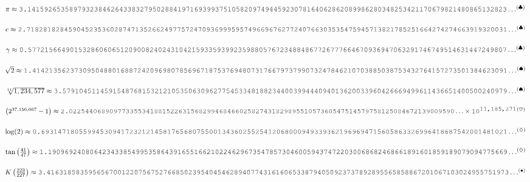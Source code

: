 \begin{flushleft}

\large

\vspace{0.0pt} $\pi \approx
\mbox{\courier{3.1415926535897932384626433832795028841971693993751058209749445923078164062862089986280348253421170679821480865132823}}\dots^{\left ( \clubsuit \right )}$

\vspace{7.0pt} $e \approx
\mbox{\courier{2.7182818284590452353602874713526624977572470936999595749669676277240766303535475945713821785251664274274663919320031}}\dots^{\left ( \clubsuit \right )}$

\vspace{7.0pt} $\gamma \approx
\mbox{\courier{0.577215664901532860606512090082402431042159335939923598805767234884867726777664670936947063291746749514631447249807}}\dots^{\left ( \clubsuit \right )}$

\vspace{7.0pt} $\sqrt{2} \approx
\mbox{\courier{1.41421356237309504880168872420969807856967187537694807317667973799073247846210703885038753432764157273501384623091}}\dots^{\left ( \spadesuit \right )}$

\vspace{7.0pt} $\sqrt[11]{1,234,577} \approx
\mbox{\courier{3.5791045114591548768153212105350630962775453348188234400399444094013620033960426669499611436651400500240979}}\dots^{\left ( \spadesuit \right )}$

\vspace{7.0pt} $\left ( 2^{37,156,667} - 1 \right ) \approx
\mbox{\courier{2.02254406890977335534188152263156829946846602582743182989551057360547514579758125084672139009590}}\dots\courierNineMakeTenPowX{11,185,271}{^{\left ( \heartsuit \right )}}$

\vspace{7.0pt} $\log(2) \approx
\mbox{\courier{0.693147180559945309417232121458176568075500134360255254120680009493393621969694715605863326996418687542001481021}}\dots^{\left ( \diamondsuit \right )}$

\vspace{7.0pt} $\tan \left( \frac{41}{47} \right ) \approx
\mbox{\courier{1.19096924080642343385499535864391655166210224629673547857304600594374722030068682468661891601859189079094775669}}\dots^{\left ( \diamondsuit \right )}$

\vspace{7.0pt} $K \left ( \frac{223}{227} \right ) \approx
\mbox{\courier{3.416318583595656700122075675276685023954045462894077431616065338794050923737892895565858867201067103024955751973}}\dots^{\left ( \bullet \right )}$


\end{flushleft}
